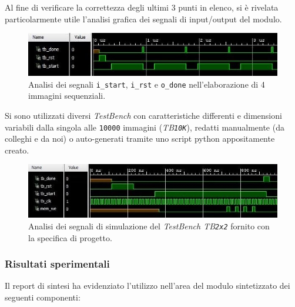 \documentclass{article}
\begin{document}
Al fine di verificare la correttezza degli ultimi 3 punti in elenco, si è rivelata particolarmente utile l'analisi grafica dei segnali di input/output del modulo.
\vspace{0,3cm}

\begin{figure}[ht]
    \centering
    \includegraphics[scale=0.9]{segnaliSignificativi.jpg}
    \caption{Analisi dei segnali \texttt{i\_start}, \texttt{i\_rst} e \texttt{o\_done} nell'elaborazione di 4 immagini sequenziali.}
\end{figure}
\vspace{0,3cm}

Si sono utilizzati diversi \emph{TestBench} con caratteristiche differenti e dimensioni variabili dalla singola alle \texttt{10000} immagini (\emph{TB\texttt{10K}}), redatti manualmente (da colleghi e da noi) o auto-generati tramite uno script python appositamente creato.
\vspace{0,3cm}

\begin{figure}[ht]
    \centering
    \includegraphics[scale=0.8]{2x2.jpg}
    \caption{Analisi dei segnali di simulazione del \emph{TestBench TB\texttt{2x2}} fornito con la specifica di progetto.}
\end{figure}
\vspace{0,3cm}

\subsubsection{Risultati sperimentali}
Il report di sintesi ha evidenziato l’utilizzo nell’area del modulo sintetizzato dei seguenti componenti:

\pagebreak
\end{document}
